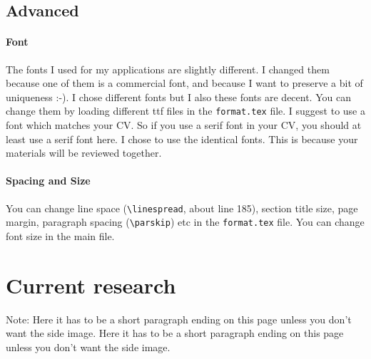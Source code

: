 \begin{minipage}[t]{504pt}
\begin{minipage}[t]{350pt}
\subsection{Advanced}
\paragraph{Font} The fonts I used for my applications are slightly different.  I changed them because one of them is a commercial font, and because I want to preserve a bit of uniqueness :-). I chose different fonts but I also these fonts are decent. You can change them by loading different ttf files in the \verb|format.tex| file.
I suggest to use a font which matches your CV. So  if you use a serif font in your CV, you should at least use a serif font here. I chose to use the identical fonts. This is because your materials will be reviewed together. 

\paragraph{Spacing and Size} You can change line space  (\verb|\linespread|, about line 185), section title size, page margin, paragraph spacing (\verb|\parskip|) etc in the \verb|format.tex| file.
You can change font size in the main file. 

\section{Current research}

\lipsum[1]

Note: Here it has to be a short paragraph ending on this page unless you don't want the side image. Here it has to be a short paragraph ending on this page unless you don't want the side image. 


\end{minipage}
\end{minipage}
